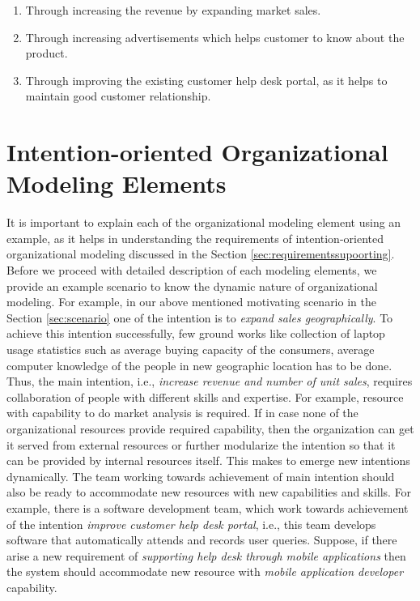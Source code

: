 \begin{enumerate}
 	\item Through increasing the revenue by expanding market sales. 
 	\item Through increasing advertisements which helps customer to know about the product.
 	\item Through improving the existing customer help desk portal, as it helps to maintain good customer relationship.
 \end{enumerate}
 
\section{Intention-oriented Organizational Modeling Elements}
\label{sec:entities}
It is important to explain each of the organizational modeling element using an example, as it helps in understanding the requirements of intention-oriented organizational modeling discussed in the Section \ref{sec:requirementssupoorting}. Before we proceed with detailed description of each modeling elements, we provide an example scenario to know the dynamic nature of organizational modeling. For example, in our above mentioned motivating scenario in the Section \ref{sec:scenario} one of the intention is to \textit{expand sales geographically}. To achieve this intention successfully, few ground works like collection of laptop usage statistics such as average buying capacity of the consumers, average computer knowledge of the people in new geographic location has to be done. Thus, the main intention, i.e., \textit{increase revenue and number of unit sales}, requires collaboration of people with different skills and expertise. For example, resource with capability to do market analysis is required. If in case none of the organizational resources provide required capability, then the organization can get it served from external resources or further modularize the intention so that it can be provided by internal resources itself. This makes to emerge new intentions dynamically. The team working towards achievement of main intention should also be ready to accommodate new resources with new capabilities and skills. For example, there is a software development team, which work towards achievement of the intention \textit{improve customer help desk portal}, i.e., this team develops software that automatically attends and records user queries. Suppose, if there arise a new requirement of \textit{supporting help desk through mobile applications} then the system should accommodate new resource with \textit{mobile application developer} capability. 

